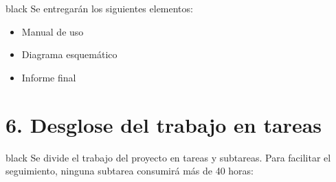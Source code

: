 \documentclass[11pt]{charter}
\begin{document}
\begin{consigna}{black}
Se entregarán los siguientes elementos:
\begin{itemize}
\item Manual de uso
\item Diagrama esquemático
\item Informe final
\end{itemize}

\end{consigna}

\section{6. Desglose del trabajo en tareas}
\label{sec:wbs}

\begin{consigna}{black}
Se divide el trabajo del proyecto en tareas y subtareas. Para facilitar el seguimiento, ninguna subtarea
consumirá más de 40 horas:


\end{consigna}
\end{document}
